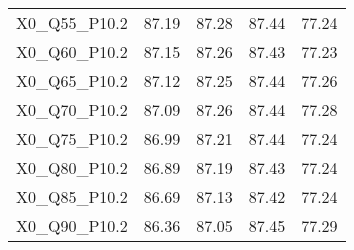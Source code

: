 \begin{table}[ht]
\begin{tabular}{rrrrr}
  X0\_Q55\_P10.2 & 87.19 & 87.28 & 87.44 & 77.24 \\ 
  X0\_Q60\_P10.2 & 87.15 & 87.26 & 87.43 & 77.23 \\ 
  X0\_Q65\_P10.2 & 87.12 & 87.25 & 87.44 & 77.26 \\ 
  X0\_Q70\_P10.2 & 87.09 & 87.26 & 87.44 & 77.28 \\ 
  X0\_Q75\_P10.2 & 86.99 & 87.21 & 87.44 & 77.24 \\ 
  X0\_Q80\_P10.2 & 86.89 & 87.19 & 87.43 & 77.24 \\ 
  X0\_Q85\_P10.2 & 86.69 & 87.13 & 87.42 & 77.24 \\ 
  X0\_Q90\_P10.2 & 86.36 & 87.05 & 87.45 & 77.29 \\ 
   \hline
\end{tabular}
\end{table}
